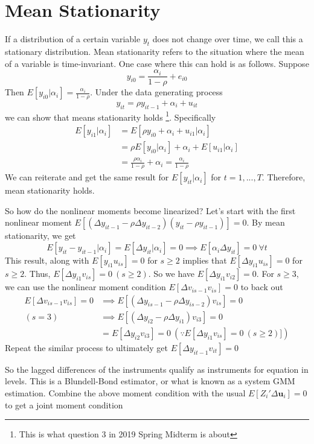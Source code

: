\section{Mean Stationarity}
If a distribution of a certain variable $y_t$ does not change over time, we call this a stationary distribution. Mean stationarity refers to the situation where the mean of a variable is time-invariant. One case where this can hold is as follows. Suppose
\[
y_{i0}=\frac{\alpha_i}{1-\rho}+e_{i0}
\]
Then $E[y_{i0}|\alpha_i]=\frac{\alpha_i}{1-\rho}$. Under the data generating process
\[
y_{it}=\rho y_{it-1}+\alpha_i +u_{it}
\]
we can show that means stationarity holds \footnote{This is what question 3 in 2019 Spring Midterm is about}. Specifically
\begin{align*}
E[y_{i1}|\alpha_i]&= E[\rho y_{i0}+\alpha_i +u_{i1}|\alpha_i]\\
&= \rho E[y_{i0}|\alpha_i]+\alpha_i + E[u_{i1}|\alpha_i]\\
&= \frac{\rho\alpha_i}{1-\rho}+\alpha_i = \frac{\alpha_i}{1-\rho}
\end{align*}
We can reiterate and get the same result for $E[y_{it}|\alpha_i]$ for $t=1,...,T$. Therefore, mean stationarity holds. \par
So how do the nonlinear moments become linearized? Let's start with the first nonlinear moment $E[(\Delta y_{it-1}-\rho\Delta y_{it-2})(y_{it}-\rho y_{it-1})]=0$. By mean stationarity, we get
\[
E[y_{it}-y_{it-1}|\alpha_i]=E[\Delta y_{it}|\alpha_i]=0 \implies E[\alpha_i \Delta y_{it}]=0 \ \forall t
\]
This result, along with $E[y_{i1}u_{is}]=0$ for $s\geq 2$ implies that $E[\Delta y_{i1}u_{is}]=0$ for $s\geq 2$. Thus, $E[\Delta y_{i1}v_{is}]=0 \ (s\geq 2)$. So we have $E[\Delta y_{i1}v_{i2}]=0$. For $s\geq 3$, we can use the nonlinear moment condition $E[\Delta v_{is-1}v_{is}]=0$ to back out
\begin{align*}
E[\Delta v_{is-1}v_{is}]=0&\implies E[(\Delta y_{is-1}-\rho \Delta y_{is-2})v_{is}]=0\\
(s=3)&\implies E[(\Delta y_{i2}-\rho\Delta y_{i1})v_{i3}]=0\\
&=E[\Delta y_{i2}v_{i3}]=0 \ (\because E[\Delta y_{i1}v_{is}]=0 \ (s\geq 2)])
\end{align*}
Repeat the similar process to ultimately get $E[\Delta y_{it-1}v_{it}]=0$\par
So the lagged differences of the instruments qualify as instruments for equation in levels. This is a Blundell-Bond estimator, or what is known as a system GMM estimation. Combine the above moment condition with the usual $E[Z_i'\Delta \mathbf{u}_i]=0$ to get a joint moment condition
